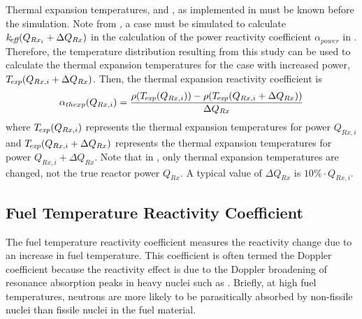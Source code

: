     Thermal expansion temperatures, \texpfuel and \texpstruct, as implemented in
     must be known before the simulation. Note from
    , a case must be simulated to
    calculate $k_{\!\mbox{\scriptsize \em eff}}(Q_{Rx_i} + \Delta Q_{Rx})$ in the calculation of the power
    reactivity coefficient $\alpha_{power}$ in
    . Therefore, the temperature
    distribution resulting from this study can be used to calculate the thermal
    expansion temperatures for the case with increased power, ${{T_{\!\mbox{\scriptsize \em exp}}}(Q_{Rx,i} +
    \Delta Q_{Rx})}$. Then, the thermal expansion reactivity coefficient is 
    \begin{equation}
      \label{eq:thermal_expansion_reactivity_coefficient}
      \alpha_{thexp}(Q_{Rx,i}) = \frac{\rho({T_{\!\mbox{\scriptsize \em exp}}}(Q_{Rx,i})) - 
        \rho({T_{\!\mbox{\scriptsize \em exp}}}(Q_{Rx,i} + \Delta Q_{Rx}))}
        {\Delta Q_{Rx}}
    \end{equation}
    where ${T_{\!\mbox{\scriptsize \em exp}}}(Q_{Rx,i})$ represents the thermal expansion temperatures for
    power $Q_{Rx,i}$ and ${T_{\!\mbox{\scriptsize \em exp}}}(Q_{Rx,i} + \Delta Q_{Rx})$ represents the
    thermal expansion temperatures for power $Q_{Rx,i} + \Delta Q_{Rx}$. Note
    that in , only thermal
    expansion temperatures are changed, not the true reactor power $Q_{Rx}$.
    A typical value of $\Delta Q_{Rx}$ is $10\% \cdot Q_{Rx,i}$.

  \subsection{Fuel Temperature Reactivity Coefficient}
  \label{sec:fuel_temperature_reactivity_coefficient}
    The fuel temperature reactivity coefficient measures the reactivity change 
    due to an increase in fuel temperature. This coefficient is often termed the
    Doppler coefficient because the reactivity effect is due to the Doppler
    broadening of resonance absorption peaks in heavy nuclei such as
     \cite{textbookknief}. Briefly, at high fuel temperatures, 
    neutrons are more likely to be parasitically absorbed by non-fissile nuclei
    than fissile nuclei in the fuel material.

